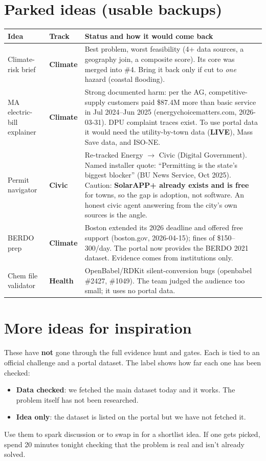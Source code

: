 \documentclass[11pt]{article}
\newcommand{\LIVE}{\textcolor{okgreen}{\textbf{LIVE}}}
\newcommand{\tagC}{\textcolor{civic}{\textbf{Civic}}}
\newcommand{\tagE}{\textcolor{clim}{\textbf{Climate}}}
\newcommand{\tagH}{\textcolor{health}{\textbf{Health}}}
\begin{document}
\section{Parked ideas (usable backups)}

\begin{longtable}{@{}L{2.8cm} L{1.6cm} L{10.6cm}@{}}
\toprule
\textbf{Idea} & \textbf{Track} & \textbf{Status and how it would come back}\\
\midrule
\endhead
Climate-risk brief & \tagE & Best problem, worst feasibility (4+ data sources, a geography join, a composite score). Its core was merged into \#4. Bring it back only if cut to \emph{one} hazard (coastal flooding).\\
MA electric-bill explainer & \tagE & Strong documented harm: per the AG, competitive-supply customers paid \$87.4M more than basic service in Jul 2024--Jun 2025 (energychoicematters.com, 2026-03-31). DPU complaint traces exist. To use portal data it would need the utility-by-town data (\LIVE), Mass Save data, and ISO-NE.\\
Permit navigator & \tagC & Re-tracked Energy $\rightarrow$ Civic (Digital Government). Named installer quote: ``Permitting is the state's biggest blocker'' (BU News Service, Oct 2025). Caution: \textbf{SolarAPP+ already exists and is free} for towns, so the gap is adoption, not software. An honest civic agent answering from the city's own sources is the angle.\\
BERDO prep & \tagE & Boston extended its 2026 deadline and offered free support (boston.gov, 2026-04-15); fines of \$150--300/day. The portal now provides the BERDO 2021 dataset. Evidence comes from institutions only.\\
Chem file validator & \tagH & OpenBabel/RDKit silent-conversion bugs (openbabel \#2427, \#1049). The team judged the audience too small; it uses no portal data.\\
\bottomrule
\end{longtable}

\section{More ideas for inspiration}\label{sec:inspo}
These have \textbf{not} gone through the full evidence hunt and gates. Each is tied to an
official challenge and a portal dataset. The label shows how far each one has been checked:
\begin{itemize}
\item \textbf{Data checked}: we fetched the main dataset today and it works. The problem itself has not been researched.
\item \textbf{Idea only}: the dataset is listed on the portal but we have not fetched it.
\end{itemize}
Use them to spark discussion or to swap in for a shortlist idea. If one gets picked, spend
20 minutes tonight checking that the problem is real and isn't already solved.
\end{document}
